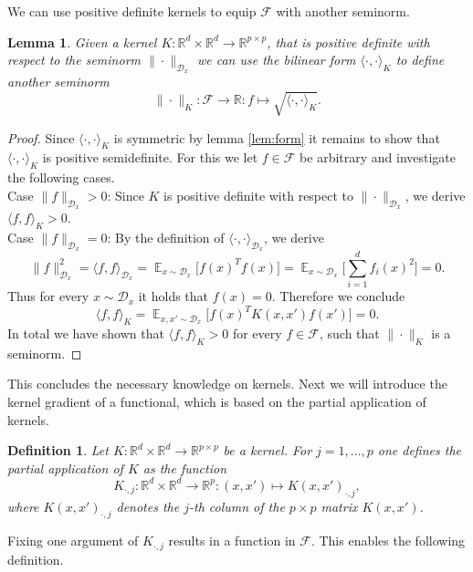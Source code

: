 \documentclass[11pt, a4paper]{article}
\newtheorem{lemma}[theorem]{Lemma}
\newtheorem{definition}[theorem]{Definition}
\newcommand{\R}{\mathds{R}}
\newcommand{\D}{\mathcal{D}}
\newcommand{\F}{\mathcal{F}}
\DeclareMathOperator*{\E}{\mathds{E}}
\begin{document}
We can use positive definite kernels to equip $\F$ with another seminorm.

\begin{lemma}
Given a kernel $K: \R^d \times \R^d \to \R^{p \times p}$, that is positive definite with respect to the seminorm $\| \cdot \|_{\D_x}$ we can use the bilinear form $\langle \cdot, \cdot \rangle_K$ to define another seminorm
\[ \| \cdot \|_K: \F \to \R : f \mapsto \sqrt{\langle \cdot, \cdot \rangle_K}.  \]
\end{lemma}

\begin{proof}
Since $\langle \cdot, \cdot \rangle_K$ is symmetric by lemma \ref{lem:form} it remains to show that $\langle \cdot, \cdot \rangle_K$ is positive semidefinite. For this we let $f \in \F$ be arbitrary and investigate the following cases. \\

Case $\| f \|_{\D_x} > 0$: Since $K$ is positive definite with respect to $\| \cdot \| _{\D_x}$, we derive $\langle f, f \rangle_K > 0$. \\

Case $\| f \|_{\D_x} = 0$: By the definition of $\langle \cdot , \cdot \rangle_{\D_x}$, we derive
\[ \big \| f \big \|_{\D_x}^2 = \langle f , f \rangle_{\D_x} = \E_{x \sim \D_x} \Big [ f(x)^Tf(x) \Big ] = \E_{x \sim \D_x} \Big [ \sum_{i=1}^{d} f_i(x)^2 \Big ] = 0. \]
Thus for every $x \sim \D_x$ it holds that $f(x) = 0$. Therefore we conclude
\[ \langle f , f \rangle_{K} = \E_{x,x' \sim \D_x} \Big [ f(x)^TK(x,x')f(x') \Big ] = 0. \]
In total we have shown that $\langle f, f \rangle_K > 0$ for every $f \in \F$, such that $\| \cdot \|_K$ is a seminorm.
\end{proof}

This concludes the necessary knowledge on kernels. Next we will introduce the kernel gradient of a functional, which is based on the partial application of kernels.

\begin{definition}
Let $K: \R^d \times \R^d \to \R^{p \times p}$ be a kernel. For $j=1, \dots, p$ one defines the partial application of $K$ as the function
\[ K_{\cdot,j} : \R^d \times \R^d \to \R^p : (x,x') \mapsto K(x,x')_{\cdot,j}, \]
where $K(x,x')_{\cdot,j}$ denotes the $j$-th column of the $p \times p $ matrix $K(x,x')$.
\end{definition}

Fixing one argument of $K_{\cdot,j}$ results in a function in $\F$. This enables the following definition.
\end{document}
